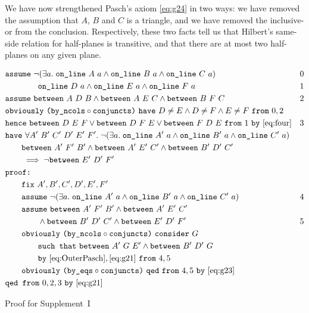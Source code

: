 We have now strengthened Pasch's axiom \eqref{eq:g24} in two ways: we have removed the assumption that $A$, $B$ and $C$ is a triangle, and we have removed the inclusive-or from the conclusion. Respectively, these two facts tell us that Hilbert's same-side relation for half-planes is transitive, and that there are at most two half-planes on any given plane.


\begin{boxedfigure}
  \small
  \begin{align*}
    &\code{assume}\ \Triangle{a}{A}{B}{C} & 0\\
    &\qquad\qquad \code{on\_line}\ D\ a \wedge \code{on\_line}\ E\ a \wedge \code{on\_line}\ F\ a & 1\\
    &\code{assume}\ \between{A}{D}{B} \wedge \between{A}{E}{C} \wedge \between{B}{F}{C} & 2\\
    &\code{obviously}\ \code{(by\_ncols} \circ \code{conjuncts)}\ \code{have}\ D\neq E \wedge D\neq F \wedge E\neq F\ \code{from}\ 0,2\\
    &\code{hence}\ \between{D}{E}{F}\vee\between{D}{F}{E}\vee\between{F}{D}{E}\ \code{from}\ 1\ \code{by} \ \eqref{eq:four}&3\\
    &\code{have}\ \forall A'\ B'\ C'\ D'\ E'\ F'.\; \Triangle{a}{A'}{B'}{C'}\\
    &\qquad \between{A'}{F'}{B'} \wedge \between{A'}{E'}{C'} \wedge \between{B'}{D'}{C'}\\
    &\qquad \implies \neg\between{E'}{D'}{F'}\\ 
    &\code{proof:}\\
    &\qquad \code{fix}\ A',B',C',D',E',F'\\
    &\qquad \code{assume}\ \Triangle{a}{A'}{B'}{C'} & 4\\
    &\qquad \code{assume}\ \between{A'}{F'}{B'} \wedge \between{A'}{E'}{C'}\\ &\qquad\qquad\wedge\between{B'}{D'}{C'}\wedge\between{E'}{D'}{F'} & 5\\
    &\qquad\code{obviously}\ \code{(by\_ncols} \circ \code{conjuncts)}\ \code{consider}\ G\ \\ &\qquad\qquad\code{such that}\ \between{A'}{G}{E'} \wedge \between{B'}{D'}{G}\\ 
    &\qquad\qquad\code{by}\ \eqref{eq:OuterPasch},\eqref{eq:g21}\ \code{from}\ 4,5\\
    &\qquad\code{obviously}\ \code{(by\_eqs} \circ \code{conjuncts)}\  \code{qed}\ \code{from}\ 4,5\ \code{by}\ \eqref{eq:g23}\\
    &\code{qed from}\ 0,2,3\ \code{by}\ \eqref{eq:g21}
  \end{align*}
  \caption{Proof for Supplement~I}
  \label{fig:SupplementIProof}
\end{boxedfigure}
